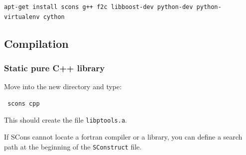 \documentclass[12pt,a4paper]{article}
\begin{document}
\begin{verbatim}
apt-get install scons g++ f2c libboost-dev python-dev python-virtualenv cython 
\end{verbatim}
%


% 
% 
% 
% 
% 
% 
% 
% 




\subsection{Compilation}

\subsubsection{Static pure C++ library}

Move into the new directory and type:

\begin{verbatim}
 scons cpp
\end{verbatim}

This should create the file {\tt libptools.a}.

If SCons cannot locate a fortran compiler or a library, you can define a search path at the beginning of
the {\tt SConstruct} file.
\end{document}
